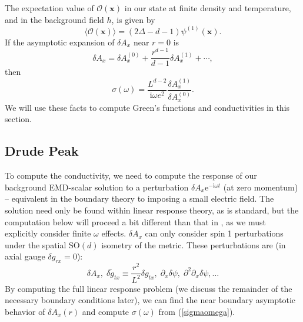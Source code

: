 \documentclass[10pt, oneside]{book}
\begin{document}
\begin{doublespace}
The expectation value of $\mathcal{O}(\mathbf{x})$ in our state at finite density and temperature, and in the background field $h$, is given by \cite{deHaro:2000xn} \begin{equation}
\langle \mathcal{O}(\mathbf{x})\rangle  = (2\Delta-d-1) \psi^{(1)}(\mathbf{x}).   \label{expo}
\end{equation}
If the asymptotic expansion of $\delta A_x$ near $r=0$ is \begin{equation}
\delta A_x = \delta A_x^{(0)}  + \frac{r^{d-1}}{d-1} \delta A_x^{(1)} + \cdots,
\end{equation}then \begin{equation}
\sigma(\omega) = \frac{L^{d-2}}{\mathrm{i}\omega e^2} \frac{\delta A_x^{(1)}}{\delta A_x^{(0)}}.  \label{sigmaomega}
\end{equation}
We will use these facts to compute Green's functions and conductivities in this section.

\subsection{Drude Peak}
To compute the conductivity, we need to compute the response of our background EMD-scalar solution to a perturbation $\delta A_x \mathrm{e}^{-\mathrm{i}\omega t}$ (at zero momentum) -- equivalent in the boundary theory to imposing a small electric field.   The solution need only be found within linear response theory, as is standard, but the computation below will proceed a bit different than that in \cite{Blake:2013owa, lucas1401}, as we must explicitly consider finite $\omega$ effects.      $\delta A_x$ can only consider spin 1 perturbations under the spatial $\mathrm{SO}(d)$ isometry of the metric.   These perturbations are (in axial gauge $\delta g_{rx}=0$): \begin{equation*}
\delta A_x, \;  \delta\tilde{g}_{tx} \equiv \frac{r^2}{L^2}\delta g_{tx}, \; \partial_x \delta \psi, \; \partial^2 \partial_x \delta \psi, \ldots
\end{equation*}
By computing the full linear response problem (we discuss the remainder of the necessary boundary conditions later), we can find the near boundary asymptotic behavior of $\delta A_x(r)$ and compute $\sigma(\omega)$ from (\ref{sigmaomega}).


\end{doublespace}
\end{document}
